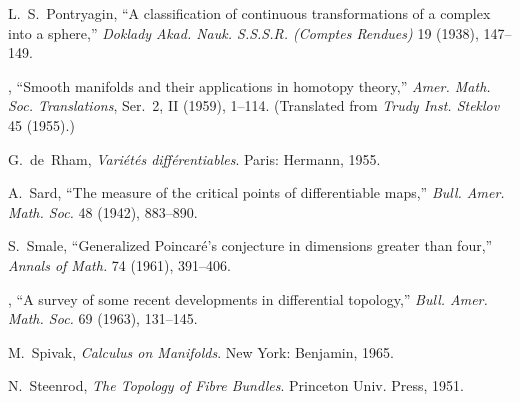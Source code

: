\noindent [27] L.~S.~Pontryagin, ``A classification of continuous transformations of a complex into a sphere,'' \emph{Doklady Akad. Nauk. S.S.S.R. (Comptes Rendues)} 19 (1938), 147--149.

\noindent [28] \textemdash, ``Smooth manifolds and their applications in homotopy theory,'' \emph{Amer. Math. Soc. Translations}, Ser.~2, II (1959), 1--114. (Translated from \emph{Trudy Inst. Steklov} 45 (1955).)

\noindent [29] G.~de~Rham, \emph{Vari\'et\'es diff\'erentiables}. Paris: Hermann, 1955.

\noindent [30] A.~Sard, ``The measure of the critical points of differentiable maps,'' \emph{Bull. Amer. Math. Soc.} 48 (1942), 883--890.

\noindent [31] S.~Smale, ``Generalized Poincar\'e's conjecture in dimensions greater than four,'' \emph{Annals of Math.} 74 (1961), 391--406.

\noindent [32] \textemdash, ``A survey of some recent developments in differential topology,'' \emph{Bull. Amer. Math. Soc.} 69 (1963), 131--145.

\noindent [33] M.~Spivak, \emph{Calculus on Manifolds}. New York: Benjamin, 1965.

\noindent [34] N.~Steenrod, \emph{The Topology of Fibre Bundles}. Princeton Univ. Press, 1951.

